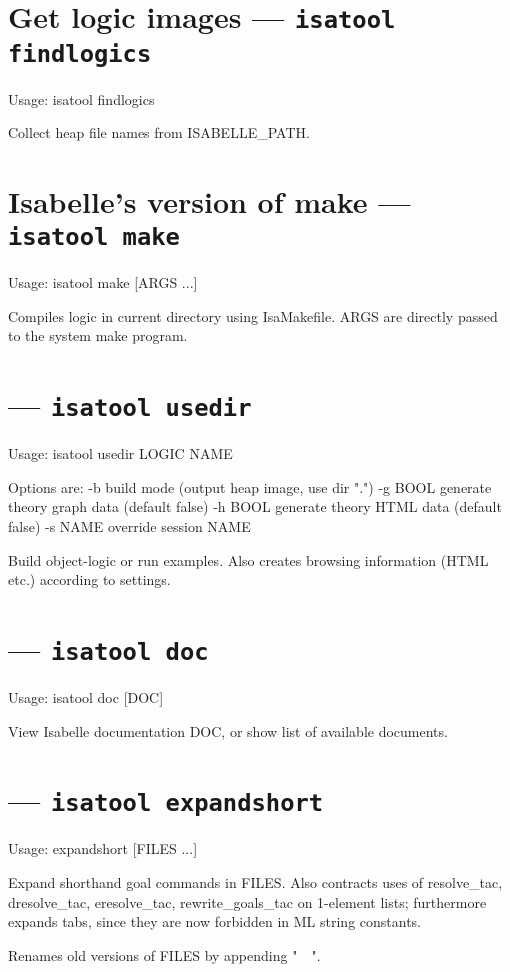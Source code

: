 \section{Get logic images --- \texttt{isatool findlogics}}

\begin{ttbox}
Usage: isatool findlogics

  Collect heap file names from ISABELLE_PATH.
\end{ttbox}

\section{Isabelle's version of make --- \texttt{isatool make}}

\begin{ttbox}
Usage: isatool make [ARGS ...]

  Compiles logic in current directory using IsaMakefile.
  ARGS are directly passed to the system make program.
\end{ttbox}


\section{ --- \texttt{isatool usedir}}

\begin{ttbox}
Usage: isatool usedir LOGIC NAME

  Options are:
    -b           build mode (output heap image, use dir ".")
    -g BOOL      generate theory graph data (default false)
    -h BOOL      generate theory HTML data (default false)
    -s NAME      override session NAME

  Build object-logic or run examples. Also creates browsing
  information (HTML etc.) according to settings.
\end{ttbox}


\section{ --- \texttt{isatool doc}}

\begin{ttbox}
Usage: isatool doc [DOC]

  View Isabelle documentation DOC, or show list of available documents.
\end{ttbox}


\section{ --- \texttt{isatool expandshort}}

\begin{ttbox}
Usage: expandshort [FILES ...]

  Expand shorthand goal commands in FILES.  Also contracts uses of
  resolve_tac, dresolve_tac, eresolve_tac, rewrite_goals_tac on
  1-element lists; furthermore expands tabs, since they are now
  forbidden in ML string constants.

  Renames old versions of FILES by appending "~~".
\end{ttbox}
